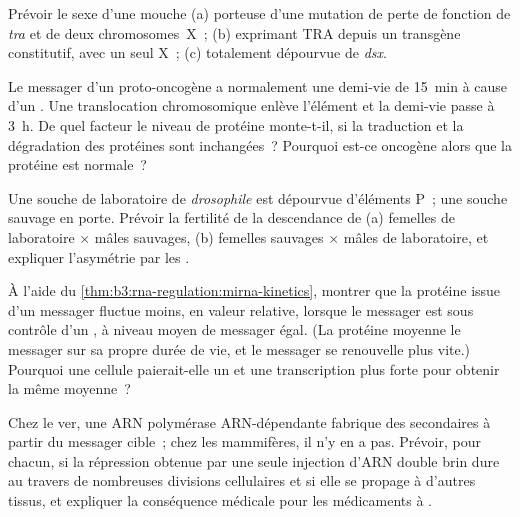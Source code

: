 \begin{exercise}[$\star\star$]\label{exo:b3:rna-regulation:7}
Prévoir le sexe d'une mouche (a) porteuse d'une mutation de perte de
fonction de \emph{tra} et de deux chromosomes~X~; (b) exprimant TRA
depuis un transgène constitutif, avec un seul X~; (c) totalement
dépourvue de \emph{dsx}.
\end{exercise}

\begin{exercise}[$\star\star$]\label{exo:b3:rna-regulation:8}
Le messager d'un proto-oncogène a normalement une demi-vie de
\qty{15}{min} à cause d'un . Une translocation
chromosomique enlève l'élément et la demi-vie passe à \qty{3}{h}. De
quel facteur le niveau de protéine monte-t-il, si la traduction et la
dégradation des protéines sont inchangées~? Pourquoi est-ce oncogène
alors que la protéine est normale~?
\end{exercise}

\begin{exercise}[$\star\star$]\label{exo:b3:rna-regulation:9}
Une souche de laboratoire de \emph{drosophile} est dépourvue d'éléments
P~; une souche sauvage en porte. Prévoir la fertilité de la descendance
de (a) femelles de laboratoire $\times$ mâles sauvages, (b) femelles
sauvages $\times$ mâles de laboratoire, et expliquer l'asymétrie par
les .
\end{exercise}

\begin{exercise}[$\star\star\star$]\label{exo:b3:rna-regulation:10}
À l'aide du \cref{thm:b3:rna-regulation:mirna-kinetics}, montrer que la
protéine issue d'un messager fluctue moins, en valeur relative, lorsque
le messager est sous contrôle d'un , à niveau moyen de messager
égal. (La protéine moyenne le messager sur sa propre durée de vie, et
le messager se renouvelle plus vite.) Pourquoi une cellule paierait-elle
un  et une transcription plus forte pour obtenir la même
moyenne~?
\end{exercise}

\begin{exercise}[$\star\star\star$]\label{exo:b3:rna-regulation:11}
Chez le ver, une ARN polymérase ARN-dépendante fabrique des 
secondaires à partir du messager cible~; chez les mammifères, il n'y en
a pas. Prévoir, pour chacun, si la répression obtenue par une seule
injection d'ARN double brin dure au travers de nombreuses divisions
cellulaires et si elle se propage à d'autres tissus, et expliquer la
conséquence médicale pour les médicaments à .
\end{exercise}

